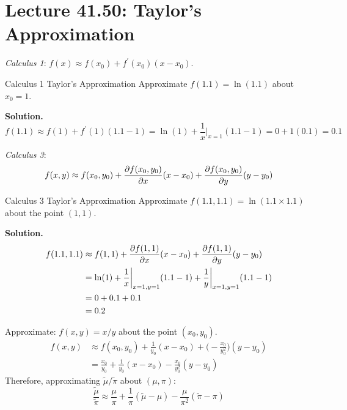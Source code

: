 \section{Lecture 41.50: Taylor's Approximation}
\emph{Calculus 1}: $ f(x)\approx f(x_0)+f^\prime(x_0)(x-x_0) $.
\begin{Example}{Calculus 1 Taylor's Approximation}{}
    Approximate $ f(1.1)=\ln(1.1) $ about $ x_0=1 $.

    \textbf{Solution.}
    \[ f(1.1)\approx f(1)+f^\prime(1)(1.1-1)=\ln(1)+\frac{1}{x}\bigg\vert_{x=1} (1.1-1)=0+1(0.1)=0.1 \]
\end{Example}
\emph{Calculus 3}:
\[ f(x,y)\approx f(x_0,y_0)+\pdv{f(x_0,y_0)}{x}(x-x_0)+\pdv{f(x_0,y_0)}{y}(y-y_0) \]
\begin{Example}{Calculus 3 Taylor's Approximation}{}
    Approximate $ f(1.1,1.1)=\ln(1.1\times 1.1) $ about the point $ (1,1) $.

    \textbf{Solution.}
    \begin{align*}
        f(1.1,1.1)
         & \approx f(1,1)+\pdv{f(1,1)}{x}(x-x_0)+\pdv{f(1,1)}{y}(y-y_0)                          \\
         & =\ln(1)+\frac{1}{x}\bigg\vert_{x=1,y=1}(1.1-1)+\frac{1}{y}\bigg\vert_{x=1,y=1}(1.1-1) \\
         & =0+0.1+0.1                                                                            \\
         & =0.2
    \end{align*}
\end{Example}
Approximate: $ f(x,y)=x/y $ about the point $ (x_0,y_0) $.
\begin{align*}
    f(x,y)
     & \approx f(x_0,y_0)+\frac{1}{y_0}(x-x_0)+\biggl(-\frac{x_0}{y_0^2} \biggr)(y-y_0) \\
     & =\frac{x_0}{y_0}+\frac{1}{y_0} (x-x_0)-\frac{x_0}{y_0^2}(y-y_0)
\end{align*}
Therefore, approximating $ \tilde{\mu}/\tilde{\pi} $ about $ (\mu,\pi) $:
\[ \frac{\tilde{\mu}}{\tilde{\pi}}\approx \frac{\mu}{\pi}+\frac{1}{\pi} (\tilde{\mu}-\mu)-\frac{\mu}{\pi^2}(\tilde{\pi}-\pi)   \]
